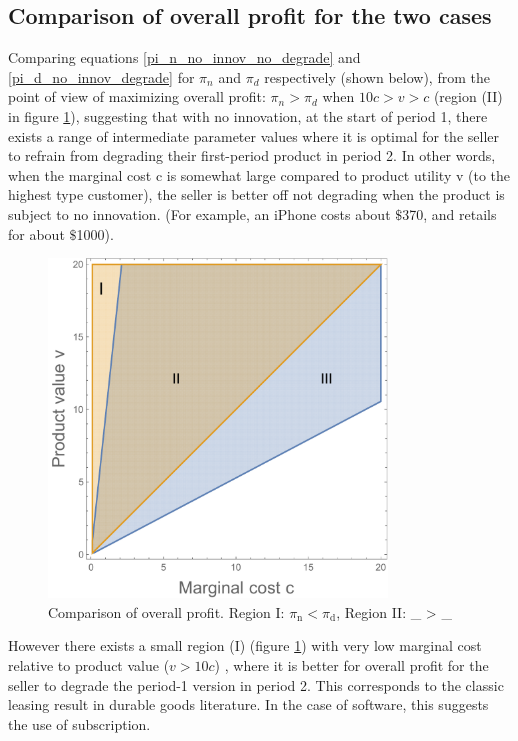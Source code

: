 \documentclass[isre,blindrev]{informs3} %
\begin{document}
\subsection{Comparison of overall profit for the two cases}
\label{no-innovate-compare-overall}

Comparing equations \ref{pi_n_no_innov_no_degrade} and \ref{pi_d_no_innov_degrade} for \(\pi _n\) and \(\pi _d\) respectively (shown below), from the point of view of maximizing overall profit:
\(\pi _n>\pi _d\) when \(10 c>v>c\) (region (II) in figure \ref{fig:fig1}), suggesting that with no innovation, at the start of period 1, there exists
a range of intermediate parameter values where it is optimal for the seller to refrain from degrading their first-period product in period 2. In
other words, when the marginal cost c is somewhat large compared to product utility v (to the highest type customer), the seller is { }better off
not degrading when the product is subject to no innovation. (For example, an iPhone costs about $\$$370, and retails for about $\$$1000).

\begin{figure}[htp]
    \centering
    \includegraphics[width=9cm]{2020_05_19-overleaf-mirror_gr1.pdf}
    \caption{Comparison of overall profit. Region I: \(\pi _{\text{n}} < \pi _{\text{d}}\), Region II: \pi _{} > \pi _{} }
    \label{fig:fig1}
\end{figure}

However there exists a small region (I) (figure \ref{fig:fig1}) with very low marginal cost relative to product value (\(v>10 c\)) , where it is better
for overall profit for the seller to degrade the period-1 version in period 2. This corresponds to the classic leasing result in durable goods literature.
In the case of software, this suggests the use of subscription.
\end{document}
